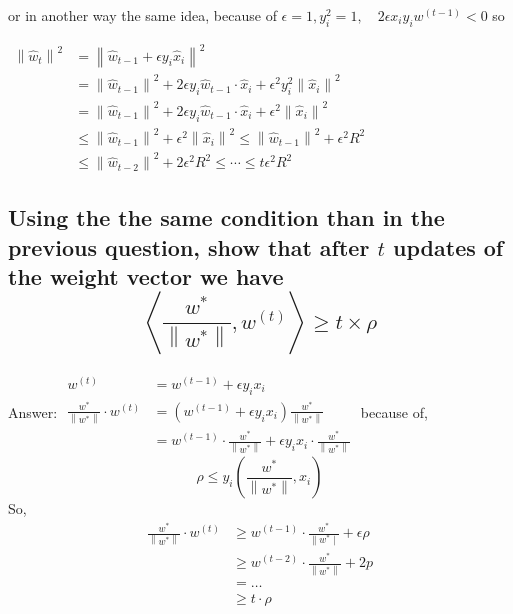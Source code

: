 \documentclass{article}
\begin{document}
or in another way the same idea,
because of $\epsilon=1,  y_{i}^{2}=1, \quad 2 \epsilon x_{i} y_{i} w^{(t-1)}<0$
so 

$\begin{aligned}\left\|\hat{w}_{t}\right\|^{2} &=\left\|\hat{w}_{t-1}+\epsilon y_{i} \hat{x}_{i}\right\|^{2} \\ &=\left\|\hat{w}_{t-1}\right\|^{2}+2 \epsilon y_{i} \hat{w}_{t-1} \cdot \hat{x}_{i}+\epsilon^{2} y_{i}^{2}\left\|\hat{x}_{i}\right\|^{2} \\ &=\left\|\hat{w}_{t-1}\right\|^{2}+2 \epsilon y_{i} \hat{w}_{t-1} \cdot \hat{x}_{i}+\epsilon^{2}\left\|\hat{x}_{i}\right\|^{2} \\ & \leq\left\|\hat{w}_{t-1}\right\|^{2}+\epsilon^{2}\left\|\hat{x}_{i}\right\|^{2} \leq\left\|\hat{w}_{t-1}\right\|^{2}+\epsilon^{2} R^{2} \\ & \leq\left\|\hat{w}_{t-2}\right\|^{2}+2 \epsilon^{2} R^{2} \leq \cdots \leq t \epsilon^{2} R^{2} \end{aligned}$

\subsection{\textbf{Using the the same condition than in the previous question, show that after $t$ updates of the weight vector we have
$$
\left\langle\frac{w^{*}}{\left\|w^{*}\right\|}, w^{(t)}\right\rangle \geq t \times \rho
$$}}
Answer:
\newline
\newline
$\begin{aligned} w^{(t)} &=w^{(t-1)}+\epsilon y_{i} x_{i} \\ \frac{w^{*}}{\left\|w^{*}\right\|} \cdot w^{(t)} &=\left(w^{(t-1)}+\epsilon y_{i} x_{i}\right) \frac{w^{*}}{\left\|w^{*}\right\|} \\ &=w^{(t-1)} \cdot \frac{w^{*}}{\left\|w^{*}\right\|}+\epsilon y_{i} x_{i} \cdot \frac{w^{*}}{\left\|w^{*}\right\|} \end{aligned}$
\newline
because of,
\newline
$$
\rho \leq y_{i}\left(\frac{w^{*}}{\left\|w^{*}\right\|}, x_{i}\right)
$$
So,
$$
\begin{aligned}
\frac{w^{*}}{\left\|w^{*}\right\|} \cdot w^{(t)} & \geqslant w^{(t-1)} \cdot \frac{w^{*}}{\| w^{*} \mid}+\epsilon \rho \\
& \geqslant w^{(t-2)} \cdot \frac{w^{*}}{\left\|w^{*}\right\|}+2 p \\
&=\ldots \\
& \geqslant t \cdot \rho
\end{aligned}
$$
\end{document}
